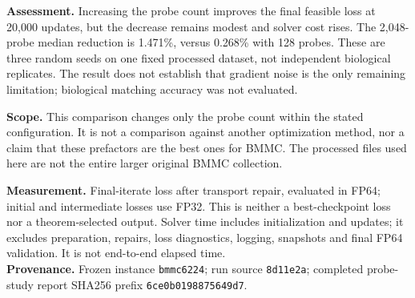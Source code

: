 \textbf{Assessment.} Increasing the probe count improves the final feasible
loss at 20,000 updates, but the decrease remains modest and solver cost rises.
The 2,048-probe median reduction is 1.471\%, versus 0.268\% with 128 probes.
These are three random seeds on one fixed processed dataset, not independent
biological replicates. The result does not establish that gradient noise is the
only remaining limitation; biological matching accuracy was not evaluated.

\textbf{Scope.} This comparison changes only the probe count within the stated
configuration. It is not a comparison against another optimization method, nor a
claim that these prefactors are the best ones for BMMC. The processed files used
here are not the entire larger original BMMC collection.

\vfill
{\footnotesize\color{muted}\textbf{Measurement.} Final-iterate loss after transport repair, evaluated in FP64;
initial and intermediate losses use FP32. This is neither a best-checkpoint loss
nor a theorem-selected output. Solver time includes initialization and updates;
it excludes preparation, repairs, loss diagnostics, logging, snapshots and final
FP64 validation. It is not end-to-end elapsed time.\\[3pt]
\textbf{Provenance.} Frozen instance \texttt{bmmc6224}; run source \texttt{8d11e2a};
completed probe-study report SHA256 prefix \texttt{6ce0b0198875649d7}.}

